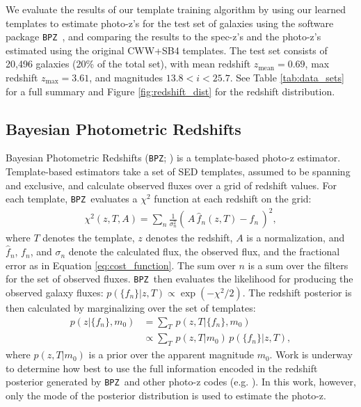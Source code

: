 \documentclass[twocolumn]{aastex63}
\newcommand{\pzcode}[1]{\texttt{#1}}
\newcommand{\bpz}{\pzcode{BPZ}}
\begin{document}
    \label{sect:photoz}

    We evaluate the results of our template training algorithm by using our learned templates to estimate photo-z's for the test set of galaxies using the software package \bpz\ \citep{Benitez2000a}, and comparing the results to the spec-z's and the photo-z's estimated using the original CWW+SB4 templates.
    The test set consists of 20,496 galaxies (20\% of the total set), with mean redshift $z_\text{mean} = 0.69$, max redshift $z_\text{max} = 3.61$, and magnitudes $13.8 < i < 25.7$.
    See Table \ref{tab:data_sets} for a full summary and Figure \ref{fig:redshift_dist} for the redshift distribution.

    \subsection{Bayesian Photometric Redshifts}
    \label{sect:bpz}

    Bayesian Photometric Redshifts (\bpz; \citealt{Benitez2000a}) is a template-based photo-z estimator.
    Template-based estimators take a set of SED templates, assumed to be spanning and exclusive, and calculate observed fluxes over a grid of redshift values.
    For each template, \bpz\ evaluates a $\chi^2$ function at each redshift on the grid:
    \begin{align}
        \chi^2 (z,T,A) = \sum_n \frac{1}{\sigma_n^2} (\, A \, \hat{f}_n(z,T) - f_n \,)^2,
        \label{eq:chi2}
    \end{align}
    where $T$ denotes the template, $z$ denotes the redshift, $A$ is a normalization, and $\hat{f}_n$, $f_n$, and $\sigma_n$ denote the calculated flux, the observed flux, and the fractional error as in Equation \ref{eq:cost_function}. 
    The sum over $n$ is a sum over the filters for the set of observed fluxes. 
    \bpz\ then evaluates the likelihood for producing the observed galaxy fluxes: $p(\{f_n\}|z,T) \propto \exp{(-\chi^2/2)}$. 
    The redshift posterior is then calculated by marginalizing over the set of templates:
    \begin{align}
        p(z|\{f_n\},m_0) &= \sum_T \, p(z,T|\{f_n\},m_0) \nonumber \\
                        &\propto \sum_T \, p(z,T|m_0) \, p(\{f_n\}|z,T),
    \end{align}
    where $p(z,T|m_0)$ is a prior over the apparent magnitude $m_0$. 
    Work is underway to determine how best to use the full information encoded in the redshift posterior generated by \bpz\ and other photo-z codes (e.g. \citealt{Schmidt2020}). 
    In this work, however, only the mode of the posterior distribution is used to estimate the photo-z.
\end{document}
